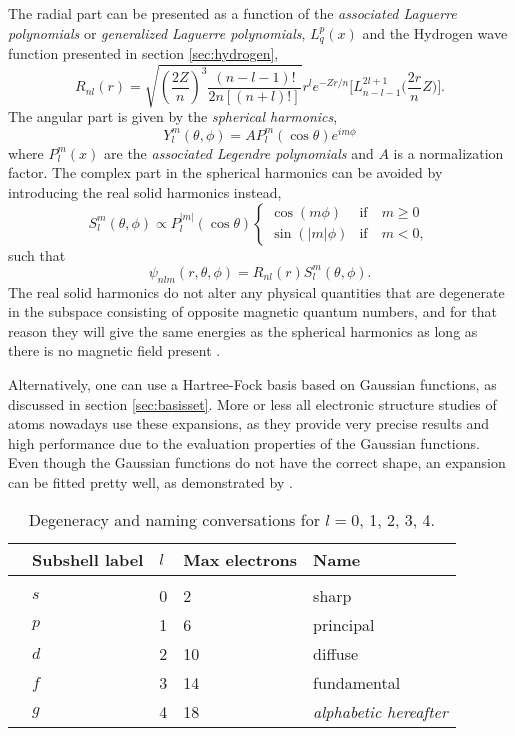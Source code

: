The radial part can be presented as a function of the \textit{associated Laguerre polynomials} or \textit{generalized Laguerre polynomials}, $L_{q}^p(x)$ and the Hydrogen wave function presented in section \ref{sec:hydrogen},
\begin{equation}
R_{nl}(r)=\sqrt{\left(\frac{2Z}{n}\right)^3\frac{(n-l-1)!}{2n[(n+l)!]}} r^le^{-Zr/n}\Big[L_{n-l-1}^{2l+1}\Big(\frac{2r}{n}Z\Big)\Big].
\end{equation}
The angular part is given by the \textit{spherical harmonics},
\begin{equation}
Y_l^m(\theta,\phi)=A P_l^m(\cos\theta)e^{im\phi}
\end{equation}
where $P_l^m(x)$ are the \textit{associated Legendre polynomials} and $A$ is a normalization factor. The complex part in the spherical harmonics can be avoided by introducing the real solid harmonics instead,
\begin{equation}
\label{eq:V_ext}
S_l^m(\theta,\phi)\propto P_l^{|m|}(\cos\theta)
\begin{cases} 
\cos(m\phi) & \text{if} \quad m\geq0 \\
\sin(|m|\phi) & \text{if} \quad m<0,
\end{cases}
\end{equation}
such that
\begin{equation}
\psi_{nlm}(r,\theta,\phi)= R_{nl}(r)S_l^m(\theta,\phi).
\label{eq:hydrogenlikesolid}
\end{equation}
The real solid harmonics do not alter any physical quantities that are degenerate in the subspace consisting of opposite magnetic quantum numbers, and for that reason they will give the same energies as the spherical harmonics as long as there is no magnetic field present \cite{morten_hjorth-jensen_computational_2019}.

Alternatively, one can use a Hartree-Fock basis based on Gaussian functions, as discussed in section \ref{sec:basisset}. More or less all electronic structure studies of atoms nowadays use these expansions, as they provide very precise results and high performance due to the evaluation properties of the Gaussian functions. Even though the Gaussian functions do not have the correct shape, an expansion can be fitted pretty well, as demonstrated by \citet{hehre_selfconsistent_1969}.

\begin{table}
	\caption{Degeneracy and naming conversations for $l=0$, 1, 2, 3, 4.  \vspace{2mm}}
	\begin{tabularx}{\textwidth}{R{0.3cm}XXXX} \hline\hline
		\label{tab:subshells}
		\makecell{\phantom{=}} & Subshell label & $l$ & Max electrons & Name \\ \hline \\
		& $s$ & 0 & 2 & sharp\\ 
		& $p$ & 1 & 6 & principal\\
		& $d$ & 2 & 10 & diffuse \\
		& $f$ & 3 & 14 & fundamental \\
		& $g$ & 4 & 18 & \textit{alphabetic hereafter} \\ \hline\hline
	\end{tabularx}
\end{table}

